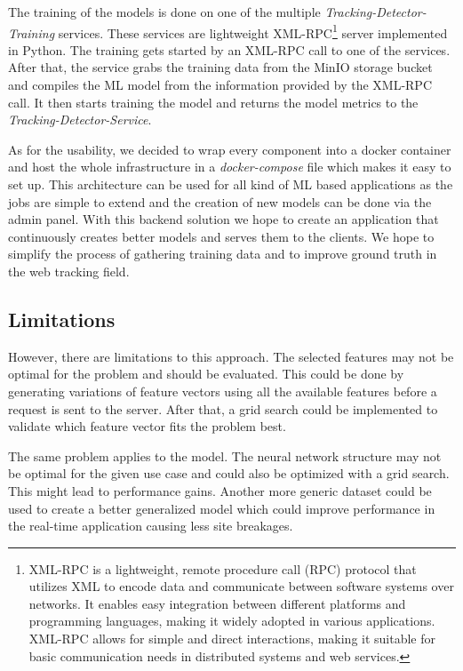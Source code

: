The training of the models is done on one of the multiple \emph{Tracking-Detector-Training} services. These services are
lightweight XML-RPC\footnote{XML-RPC is a lightweight, remote procedure call (RPC) protocol that utilizes XML to encode data and communicate between software systems over networks. It enables easy integration between different platforms and programming languages, making it widely adopted in various applications. XML-RPC allows for simple and direct interactions, making it suitable for basic communication needs in distributed systems and web services.} server implemented in Python. The training gets started by an XML-RPC call to one of the services. After that, the service
grabs the training data from the MinIO storage bucket and compiles the ML model from the information provided by the XML-RPC call. It then starts
training the model and returns the model metrics to the \emph{Tracking-Detector-Service}.

As for the usability, we decided to wrap every component into a docker container and host the whole infrastructure in a \emph{docker-compose}
file which makes it easy to set up. This architecture can be used for all kind of ML based applications as the jobs are simple to extend 
and the creation of new models can be done via the admin panel. With this backend solution we hope to create an application that continuously creates
better models and serves them to the clients. We hope to simplify the process of gathering training data and to improve
ground truth in the web tracking field.

\subsection{Limitations}

However, there are limitations to this approach. The selected features may not be optimal for the problem and should be evaluated.
This could be done by generating variations of feature vectors using all the available features before a request is sent to the server.
After that, a grid search could be implemented to validate which feature vector fits the problem best. 

The same problem applies to the model. The neural network structure may not be optimal for the given use case and could also
be optimized with a grid search. This might lead to performance gains. Another more generic dataset could be used to create a better generalized
model which could improve performance in the real-time application causing less site breakages.

